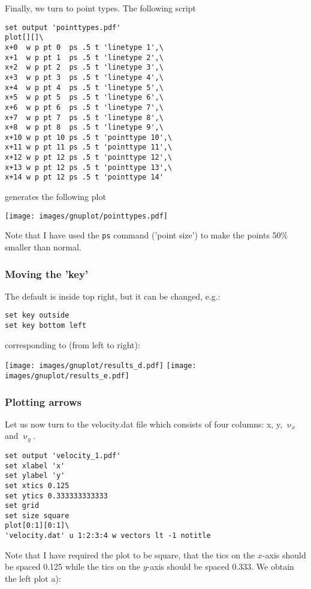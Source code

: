 Finally, we turn to point types.
The following script
\begin{verbatim}
set output 'pointtypes.pdf'
plot[][]\
x+0  w p pt 0  ps .5 t 'linetype 1',\
x+1  w p pt 1  ps .5 t 'linetype 2',\
x+2  w p pt 2  ps .5 t 'linetype 3',\
x+3  w p pt 3  ps .5 t 'linetype 4',\
x+4  w p pt 4  ps .5 t 'linetype 5',\
x+5  w p pt 5  ps .5 t 'linetype 6',\
x+6  w p pt 6  ps .5 t 'linetype 7',\
x+7  w p pt 7  ps .5 t 'linetype 8',\
x+8  w p pt 8  ps .5 t 'linetype 9',\
x+10 w p pt 10 ps .5 t 'pointtype 10',\
x+11 w p pt 11 ps .5 t 'pointtype 11',\
x+12 w p pt 12 ps .5 t 'pointtype 12',\
x+13 w p pt 12 ps .5 t 'pointtype 13',\
x+14 w p pt 12 ps .5 t 'pointtype 14' 
\end{verbatim}
generates the following plot
\begin{center}
\texttt{[image: images/gnuplot/pointtypes.pdf]}
\end{center}
Note that I have used the {\tt ps} command ('point size') to make the points 50\% smaller 
than normal. 


\subsubsection*{Moving the 'key'}

The default is inside top right, but it can be changed, e.g.:
\begin{verbatim}
set key outside
set key bottom left
\end{verbatim}
corresponding to (from left to right):
\begin{center}
\texttt{[image: images/gnuplot/results\_d.pdf]}
\texttt{[image: images/gnuplot/results\_e.pdf]}
\end{center}

\subsubsection*{Plotting arrows}

Let us now turn to the {\filenamefont velocity.dat} file which consists of 
four columns: x, y, $\upnu_x$ and $\upnu_y$.

\begin{verbatim}
set output 'velocity_1.pdf'
set xlabel 'x' 
set ylabel 'y' 
set xtics 0.125
set ytics 0.333333333333
set grid
set size square
plot[0:1][0:1]\
'velocity.dat' u 1:2:3:4 w vectors lt -1 notitle 
\end{verbatim}
Note that I have required the plot to be square, that the tics on the 
$x$-axis should be spaced 0.125 while the tics on the $y$-axis should be 
spaced 0.333. 
We obtain the left plot a): 

